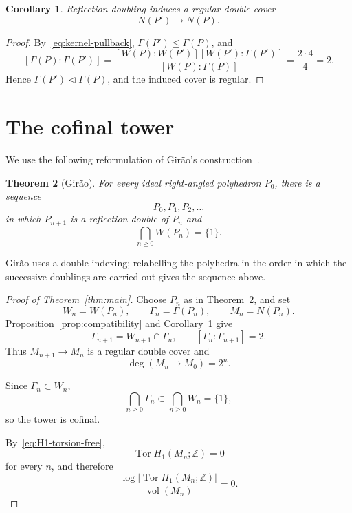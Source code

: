 \documentclass[11pt,a4paper]{amsart}
\newcommand{\ZZ}{\mathbb Z}
\newcommand{\Tor}{\operatorname{Tor}}
\newcommand{\vol}{\operatorname{vol}}
\theoremstyle{plain}
\newtheorem{theorem}{Theorem}[section]
\newtheorem{corollary}[theorem]{Corollary}
\theoremstyle{remark}
\begin{document}
\begin{corollary}\label{cor:double-cover}
Reflection doubling induces a regular double cover
\begin{equation}\label{eq:double-cover}
  N(P')\longrightarrow N(P).
\end{equation}
\end{corollary}

\begin{proof}
By~\eqref{eq:kernel-pullback}, $\Gamma(P')\leq\Gamma(P)$, and
\[
  [\Gamma(P):\Gamma(P')]
  =\frac{[W(P):W(P')][W(P'):\Gamma(P')]}
         {[W(P):\Gamma(P)]}
  =\frac{2\cdot4}{4}=2.
\]
Hence $\Gamma(P')\triangleleft\Gamma(P)$, and the induced cover is regular.
\end{proof}

\section{The cofinal tower}\label{sec:tower}

We use the following reformulation of Gir\~ao's construction~\cite[Section~5, Theorem~5.1]{Girao}.

\begin{theorem}[Gir\~ao]\label{thm:Girao}
For every ideal right-angled polyhedron $P_0$, there is a sequence
\begin{equation}\label{eq:polyhedron-sequence}
  P_0,P_1,P_2,\ldots
\end{equation}
in which $P_{n+1}$ is a reflection double of $P_n$ and
\begin{equation}\label{eq:W-cofinal}
  \bigcap_{n\geq0}W(P_n)=\{1\}.
\end{equation}
\end{theorem}

Gir\~ao uses a double indexing; relabelling the polyhedra in the order in which the successive doublings are carried out gives the sequence above.

\begin{proof}[Proof of Theorem~\ref{thm:main}]
Choose $P_n$ as in Theorem~\ref{thm:Girao}, and set
\[
  W_n=W(P_n),
  \qquad
  \Gamma_n=\Gamma(P_n),
  \qquad
  M_n=N(P_n).
\]
Proposition~\ref{prop:compatibility} and Corollary~\ref{cor:double-cover} give
\[
  \Gamma_{n+1}=W_{n+1}\cap\Gamma_n,
  \qquad
  [\Gamma_n:\Gamma_{n+1}]=2.
\]
Thus $M_{n+1}\to M_n$ is a regular double cover and
\begin{equation}\label{eq:degree}
  \deg(M_n\to M_0)=2^n.
\end{equation}

Since $\Gamma_n\subset W_n$,
\[
  \bigcap_{n\geq0}\Gamma_n
  \subset
  \bigcap_{n\geq0}W_n
  =\{1\},
\]
so the tower is cofinal.

By~\eqref{eq:H1-torsion-free},
\[
  \Tor H_1(M_n;\ZZ)=0
\]
for every $n$, and therefore
\[
  \frac{\log |\Tor H_1(M_n;\ZZ)|}{\vol(M_n)}=0.
\]

\end{proof}
\end{document}
